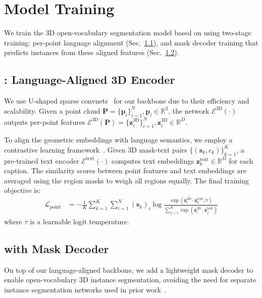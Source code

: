 
\section{\nickname Model Training}
We train the 3D open-vocabulary segmentation model based on \dataname using two-stage training: per-point language alignment (Sec.~\ref{subsec:backbone}), and mask decoder training that predicts instances from these aligned features (Sec.~\ref{subsec:mask_decoder}).

\subsection{\nickname: Language-Aligned 3D Encoder}
\label{subsec:backbone}

We use U-shaped sparse convnets~\cite{graham20183d,mink} for our backbone due to their efficiency and scalability.
Given a point cloud $\mathbf{P} = \{\mathbf{p}_i\}_{i=1}^{N},\mathbf{p}_i \in \mathbb{R}^3$, the network $\mathcal{E}^{\text{3D}}(\cdot)$ outputs per-point features $\mathcal{E}^{\text{3D}}(\mathbf{P}) = \{\mathbf{z}^{\text{3D}}_i\}_{i=1}^N, \mathbf{z}^{\text{3D}}_i \in \mathbb{R}^D$.

To align the geometric embeddings with language semantics, we employ a contrastive learning framework~\cite{yang2024regionplc,ding2022pla}.
Given 3D mask-text pairs $\{(\mathbf{s}_k, c_k)\}_{k=1}^K$, a pre-trained text encoder $\mathcal{E}^{\text{text}}(\cdot)$ computes text embeddings $\mathbf{z}^{\text{text}}_k \in \mathbb{R}^D$ for each caption.
The similarity scores between point features and text embeddings are averaged using the region masks to weigh all regions equally.
The final training objective is:
\begin{equation}
    \label{eq:caption_loss}
    \begin{aligned}
        \mathcal{L}_{\mathrm{point}} &= -\frac{1}{K}\sum_{k=1}^{K}\sum_{i=1}^{N}(\mathbf{s}_k)_i\log\frac{\exp(\mathbf{z}^{\text{3D}}_i\cdot\mathbf{z}^{\text{text}}_k/\tau)}{\sum_{j=1}^{K}\exp(\mathbf{z}^{\text{3D}}_i\cdot\mathbf{z}^{\text{text}}_j)}
    \end{aligned}
\end{equation}
where $\tau$ is a learnable logit temperature.


\subsection{\nickname with Mask Decoder}
\label{subsec:mask_decoder}

On top of our language-aligned backbone, we add a lightweight mask decoder to enable open-vocabulary 3D instance segmentation, avoiding the need for separate instance segmentation networks used in prior work~\cite{takmaz2023openmask3d,nguyen2024open3dis,huang2024openins3d,yin2024sai3d}.

